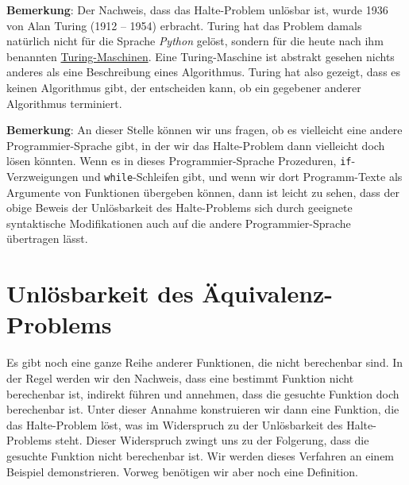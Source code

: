 \noindent
\textbf{Bemerkung}:
Der Nachweis, dass das Halte-Problem unlösbar ist, wurde 1936 von Alan Turing (1912 -- 1954)
\cite{turing:36} erbracht.  Turing hat das Problem damals natürlich nicht für die Sprache
\textsl{Python} gelöst, sondern für die heute nach ihm benannten
\href{https://de.wikipedia.org/wiki/Turingmaschine}{Turing-Maschinen}.   
Eine Turing-Maschine ist abstrakt gesehen nichts anderes als eine Beschreibung eines
Algorithmus.  Turing hat also gezeigt, dass es keinen Algorithmus gibt, der entscheiden
kann, ob ein gegebener anderer Algorithmus terminiert.
\vspace*{0.3cm}

\noindent
\textbf{Bemerkung}:
An dieser Stelle können wir uns fragen, ob es vielleicht eine andere Programmier-Sprache
gibt, in der wir das Halte-Problem dann vielleicht doch lösen könnten.  
Wenn es in dieses Programmier-Sprache Prozeduren, \texttt{if}-Verzweigungen und
\texttt{while}-Schleifen gibt, und wenn wir dort 
Programm-Texte als Argumente von Funktionen übergeben können, dann ist leicht zu sehen,
dass der obige Beweis der 
Unlösbarkeit des Halte-Problems sich durch geeignete syntaktische Modifikationen auch auf
die andere Programmier-Sprache übertragen lässt.


\section{Unlösbarkeit des Äquivalenz-Problems}
Es gibt noch eine ganze Reihe anderer Funktionen, die nicht berechenbar sind.  In der
Regel werden wir den Nachweis, dass eine bestimmt Funktion nicht berechenbar ist, indirekt führen
und annehmen, dass die gesuchte Funktion doch berechenbar ist.  Unter dieser Annahme
konstruieren wir dann eine Funktion, die das Halte-Problem löst, was im Widerspruch zu der Unlösbarkeit
des Halte-Problems steht.
Dieser Widerspruch zwingt uns zu der Folgerung, dass die gesuchte Funktion nicht berechenbar ist.
Wir werden dieses Verfahren an einem Beispiel demonstrieren.  Vorweg benötigen wir aber
noch eine Definition.

